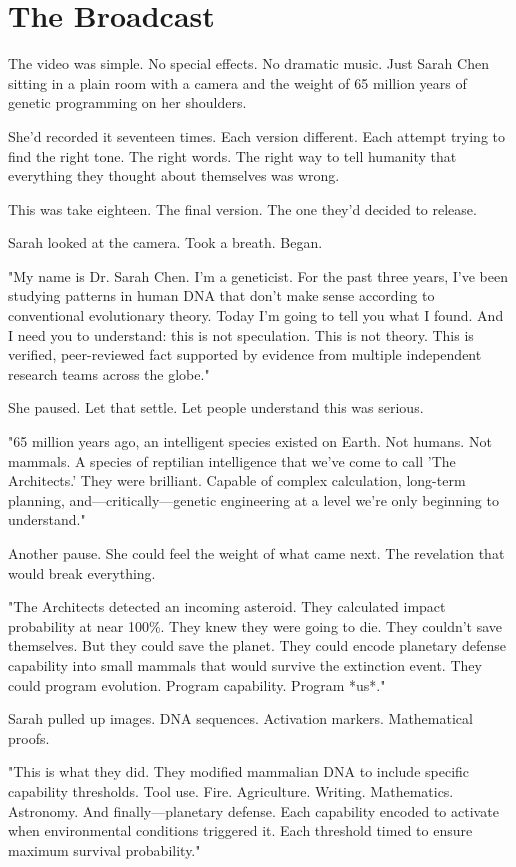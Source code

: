 \chapter{The Broadcast}
\label{ch:25}


The video was simple. No special effects. No dramatic music. Just Sarah Chen sitting in a plain room with a camera and the weight of 65 million years of genetic programming on her shoulders.

She'd recorded it seventeen times. Each version different. Each attempt trying to find the right tone. The right words. The right way to tell humanity that everything they thought about themselves was wrong.

This was take eighteen. The final version. The one they'd decided to release.

Sarah looked at the camera. Took a breath. Began.

"My name is Dr. Sarah Chen. I'm a geneticist. For the past three years, I've been studying patterns in human DNA that don't make sense according to conventional evolutionary theory. Today I'm going to tell you what I found. And I need you to understand: this is not speculation. This is not theory. This is verified, peer-reviewed fact supported by evidence from multiple independent research teams across the globe."

She paused. Let that settle. Let people understand this was serious.

"65 million years ago, an intelligent species existed on Earth. Not humans. Not mammals. A species of reptilian intelligence that we've come to call 'The Architects.' They were brilliant. Capable of complex calculation, long-term planning, and—critically—genetic engineering at a level we're only beginning to understand."

Another pause. She could feel the weight of what came next. The revelation that would break everything.

"The Architects detected an incoming asteroid. They calculated impact probability at near 100\%. They knew they were going to die. They couldn't save themselves. But they could save the planet. They could encode planetary defense capability into small mammals that would survive the extinction event. They could program evolution. Program capability. Program *us*."

Sarah pulled up images. DNA sequences. Activation markers. Mathematical proofs.

"This is what they did. They modified mammalian DNA to include specific capability thresholds. Tool use. Fire. Agriculture. Writing. Mathematics. Astronomy. And finally—planetary defense. Each capability encoded to activate when environmental conditions triggered it. Each threshold timed to ensure maximum survival probability."


